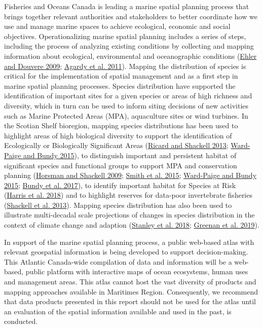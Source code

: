 \documentclass[12pt]{article}\usepackage[]{graphicx}\usepackage[]{color}
\begin{document}
Fisheries and Oceans Canada is leading a marine spatial planning process that brings together relevant authorities and stakeholders to better coordinate how we use and manage marine spaces to achieve ecological, economic and social objectives. Operationalizing marine spatial planning includes a series of steps, including the process of analyzing existing conditions by collecting and mapping information about ecological, environmental and oceanographic conditions (\protect\hyperlink{ref-Ehler:2009}{Ehler and Douvere 2009}; \protect\hyperlink{ref-Agardy:2011}{Agardy et al. 2011}). Mapping the distribution of species is critical for the implementation of spatial management and as a first step in marine spatial planning processes. Species distribution have supported the identification of important sites for a given species or areas of high richness and diversity, which in turn can be used to inform siting decisions of new activities such as Marine Protected Areas (MPA), aquaculture sites or wind turbines. In the Scotian Shelf bioregion, mapping species distributions has been used to highlight areas of high biological diversity to support the identification of Ecologically or Biologically Significant Areas (\protect\hyperlink{ref-Ricard:MARatlas:2013}{Ricard and Shackell 2013}; \protect\hyperlink{ref-WardPaige2016}{Ward-Paige and Bundy 2015}), to distinguish important and persistent habitat of significant species and functional groups to support MPA and conservation planning (\protect\hyperlink{ref-Horsman:atlas:2009}{Horsman and Shackell 2009}; \protect\hyperlink{ref-Smith2015}{Smith et al. 2015}; \protect\hyperlink{ref-WardPaige2016}{Ward-Paige and Bundy 2015}; \protect\hyperlink{ref-Bundyetal2017}{Bundy et al. 2017}), to identify important habitat for Species at Risk (\protect\hyperlink{ref-Harris:2018}{Harris et al. 2018}) and to highlight reserves for data-poor invertebrate fisheries (\protect\hyperlink{ref-Shackell2013}{Shackell et al. 2013}). Mapping species distribution has also been used to illustrate multi-decadal scale projections of changes in species distribution in the context of climate change and adaption (\protect\hyperlink{ref-Stanley:2018}{Stanley et al. 2018}; \protect\hyperlink{ref-Greenan:2019}{Greenan et al. 2019}).

In support of the marine spatial planning process, a public web-based atlas with relevant geospatial information is being developed to support decision-making. This Atlantic Canada-wide compilation of data and information will be a web-based, public platform with interactive maps of ocean ecosystems, human uses and management areas. This atlas cannot host the vast diversity of products and mapping approaches available in Maritimes Region. Consequently, we recommend that data products presented in this report should not be used for the atlas until an evaluation of the spatial information available and used in the past, is conducted.
\end{document}

